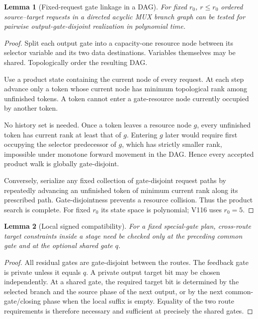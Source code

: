 \documentclass[11pt]{article}
\newtheorem{lemma}{Lemma}
\begin{document}
\begin{lemma}[Fixed-request gate linkage in a DAG]
For fixed $r_0$, $r\leq r_0$ ordered source--target requests in a directed acyclic MUX branch graph can be tested for pairwise output-gate-disjoint realization in polynomial time.
\end{lemma}
\begin{proof}
Split each output gate into a capacity-one resource node between its selector variable and its two data destinations. Variables themselves may be shared. Topologically order the resulting DAG.

Use a product state containing the current node of every request. At each step advance only a token whose current node has minimum topological rank among unfinished tokens. A token cannot enter a gate-resource node currently occupied by another token.

No history set is needed. Once a token leaves a resource node $g$, every unfinished token has current rank at least that of $g$. Entering $g$ later would require first occupying the selector predecessor of $g$, which has strictly smaller rank, impossible under monotone forward movement in the DAG. Hence every accepted product walk is globally gate-disjoint.

Conversely, serialize any fixed collection of gate-disjoint request paths by repeatedly advancing an unfinished token of minimum current rank along its prescribed path. Gate-disjointness prevents a resource collision. Thus the product search is complete. For fixed $r_0$ its state space is polynomial; V116 uses $r_0=5$.
\end{proof}

\begin{lemma}[Local signed compatibility]
For a fixed special-gate plan, cross-route target constraints inside a stage need be checked only at the preceding common gate and at the optional shared gate $q$.
\end{lemma}
\begin{proof}
All residual gates are gate-disjoint between the routes. The feedback gate is private unless it equals $q$. A private output target bit may be chosen independently. At a shared gate, the required target bit is determined by the selected branch and the source phase of the next output, or by the next common-gate/closing phase when the local suffix is empty. Equality of the two route requirements is therefore necessary and sufficient at precisely the shared gates.
\end{proof}
\end{document}
